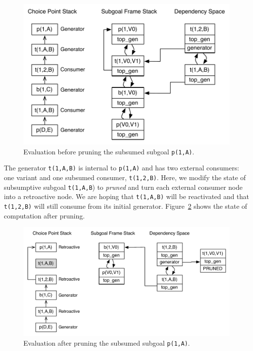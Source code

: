 \begin{figure}[ht]
  \centering
    \includegraphics[scale=0.5]{retro_sub1.pdf}
  \caption{Evaluation before pruning the subsumed subgoal \texttt{p(1,A)}.}
  \label{fig:retro_sub1}
\end{figure}

The generator \texttt{t(1,A,B)} is internal to \texttt{p(1,A)} and has two external consumers: one variant
and one subsumed consumer, \texttt{t(1,2,B)}. Here, we modify the state of subsumptive subgoal \texttt{t(1,A,B})
to \textit{pruned} and turn each external consumer node into a retroactive node. We are hoping that \texttt{t(1,A,B)}
will be reactivated and that \texttt{t(1,2,B)} will still consume from its initial generator. Figure~\ref{fig:retro_sub2}
shows the state of computation after pruning.

\begin{figure}[ht]
  \centering
    \includegraphics[scale=0.5]{retro_sub2.pdf}
  \caption{Evaluation after pruning the subsumed subgoal \texttt{p(1,A)}.}
  \label{fig:retro_sub2}
\end{figure}

